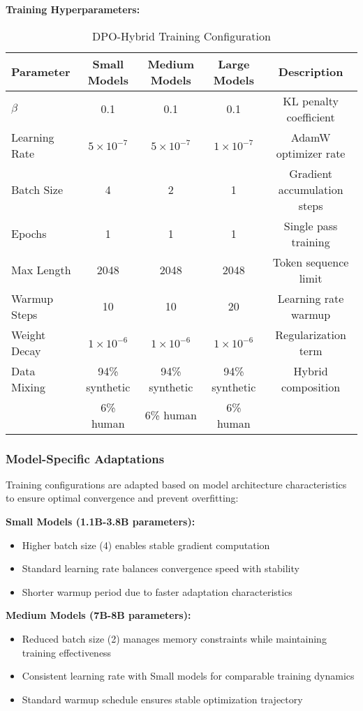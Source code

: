 \textbf{Training Hyperparameters:}
\begin{table}[H]
\centering
\caption{DPO-Hybrid Training Configuration}
\label{tab:dpo-hybrid-config}
\begin{tabular}{lcccc}
\toprule
\textbf{Parameter} & \textbf{Small Models} & \textbf{Medium Models} & \textbf{Large Models} & \textbf{Description} \\
\midrule
$\beta$ & 0.1 & 0.1 & 0.1 & KL penalty coefficient \\
Learning Rate & $5 \times 10^{-7}$ & $5 \times 10^{-7}$ & $1 \times 10^{-7}$ & AdamW optimizer rate \\
Batch Size & 4 & 2 & 1 & Gradient accumulation steps \\
Epochs & 1 & 1 & 1 & Single pass training \\
Max Length & 2048 & 2048 & 2048 & Token sequence limit \\
Warmup Steps & 10 & 10 & 20 & Learning rate warmup \\
Weight Decay & $1 \times 10^{-6}$ & $1 \times 10^{-6}$ & $1 \times 10^{-6}$ & Regularization term \\
Data Mixing & 94\% synthetic & 94\% synthetic & 94\% synthetic & Hybrid composition \\
& 6\% human & 6\% human & 6\% human & \\
\bottomrule
\end{tabular}
\end{table}

\subsubsection{Model-Specific Adaptations}

Training configurations are adapted based on model architecture characteristics to ensure optimal convergence and prevent overfitting:

\textbf{Small Models (1.1B-3.8B parameters):}
\begin{itemize}
    \item Higher batch size (4) enables stable gradient computation
    \item Standard learning rate balances convergence speed with stability
    \item Shorter warmup period due to faster adaptation characteristics
\end{itemize}

\textbf{Medium Models (7B-8B parameters):}
\begin{itemize}
    \item Reduced batch size (2) manages memory constraints while maintaining training effectiveness
    \item Consistent learning rate with Small models for comparable training dynamics
    \item Standard warmup schedule ensures stable optimization trajectory
\end{itemize}

